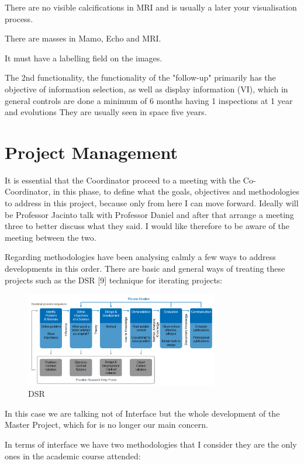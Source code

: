There are no visible calcifications in MRI and is usually a later your visualisation process.

There are masses in Mamo, Echo and MRI.

It must have a labelling field on the images.

The 2nd functionality, the functionality of the "follow-up" primarily has the objective of information selection, as well as display information (VI), which in general controls are done a minimum of 6 months having 1 inspections at 1 year and evolutions They are usually seen in space five years.

\section{Project Management}

It is essential that the Coordinator proceed to a meeting with the Co-Coordinator, in this phase, to define what the goals, objectives and methodologies to address in this project, because only from here I can move forward. Ideally will be Professor Jacinto talk with Professor Daniel and after that arrange a meeting three to better discuss what they said. I would like therefore to be aware of the meeting between the two.

Regarding methodologies have been analysing calmly a few ways to address developments in this order. There are basic and general ways of treating these projects such as the DSR [9] technique for iterating projects:

\begin{figure}[!hbt]
\centering
\includegraphics[width=0.75\textwidth]{diss_goebel_2.png}
\caption{\label{fig:frog}DSR}
\end{figure}

In this case we are talking not of Interface but the whole development of the Master Project, which for is no longer our main concern.

In terms of interface we have two methodologies that I consider they are the only ones in the academic course attended:

